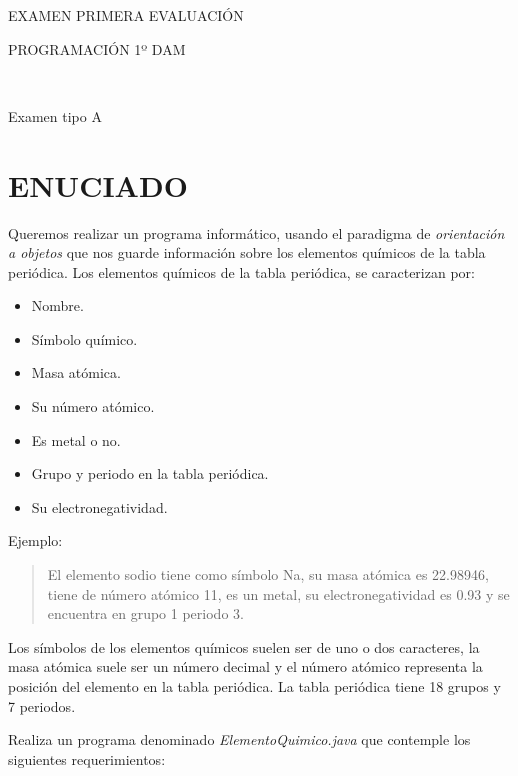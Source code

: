 \documentclass[addpoints]{exam}
\begin{document}
\begin{center}
\begin{Huge}
EXAMEN PRIMERA EVALUACIÓN
\end{Huge}
\vspace{0.06in}

\begin{huge}
PROGRAMACIÓN 1º DAM
\end{huge}\\
\vspace{0.09in}

\begin{LARGE}
Examen tipo A
\end{LARGE}
\vspace{0.1in}

\end{center}
\begin{center}
\end{center}


\vspace{0.1in}
\section{ENUCIADO}
Queremos realizar un programa informático, usando el paradigma de \emph{orientación a objetos} que nos guarde información sobre los elementos químicos de la tabla periódica. Los elementos químicos de la tabla periódica, se caracterizan por:

\begin{itemize}
\item Nombre.
\item Símbolo químico.
\item Masa atómica.
\item Su número atómico.
\item Es metal o no.
\item Grupo y periodo en la tabla periódica.
\item Su electronegatividad.
\end{itemize}
Ejemplo:
\begin{verse}
El elemento sodio tiene como símbolo Na, su masa atómica es 22.98946, tiene de número atómico 11, es un metal, su electronegatividad es 0.93 y se encuentra en grupo 1 periodo 3.
\end{verse}
Los símbolos de los elementos químicos suelen ser de uno o dos caracteres, la masa atómica suele ser un número decimal y el número atómico representa la posición del elemento en la tabla periódica. La tabla periódica tiene 18 grupos y 7 periodos.\par 
Realiza un programa denominado \emph{ElementoQuimico.java} que contemple los siguientes requerimientos:
\end{document}

